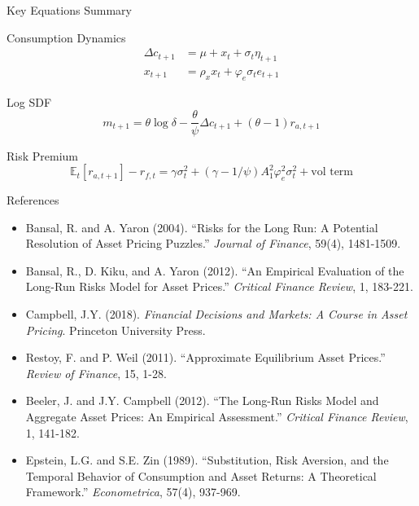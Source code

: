 \documentclass{beamer}
\newcommand{\E}{\mathbb{E}}
\begin{document}
\begin{frame}{Key Equations Summary}
    \begin{block}{Consumption Dynamics}
    \begin{align}
        \Delta c_{t+1} &= \mu + x_t + \sigma_t \eta_{t+1} \\
        x_{t+1} &= \rho_x x_t + \varphi_e \sigma_t e_{t+1}
    \end{align}
    \end{block}
    
    \begin{block}{Log SDF}
    \begin{equation}
        m_{t+1} = \theta \log \delta - \frac{\theta}{\psi} \Delta c_{t+1} + (\theta - 1) r_{a,t+1}
    \end{equation}
    \end{block}
    
    \begin{block}{Risk Premium}
    \begin{equation}
        \E_t[r_{a,t+1}] - r_{f,t} = \gamma \sigma_t^2 + (\gamma - 1/\psi) A_1^2 \varphi_e^2 \sigma_t^2 + \text{vol term}
    \end{equation}
    \end{block}
\end{frame}

\begin{frame}{References}
    \small
    \begin{itemize}
        \item Bansal, R. and A. Yaron (2004). ``Risks for the Long Run: A Potential Resolution of Asset Pricing Puzzles.'' \textit{Journal of Finance}, 59(4), 1481-1509.
        
        \item Bansal, R., D. Kiku, and A. Yaron (2012). ``An Empirical Evaluation of the Long-Run Risks Model for Asset Prices.'' \textit{Critical Finance Review}, 1, 183-221.
        
        \item Campbell, J.Y. (2018). \textit{Financial Decisions and Markets: A Course in Asset Pricing}. Princeton University Press.
        
        \item Restoy, F. and P. Weil (2011). ``Approximate Equilibrium Asset Prices.'' \textit{Review of Finance}, 15, 1-28.
        
        \item Beeler, J. and J.Y. Campbell (2012). ``The Long-Run Risks Model and Aggregate Asset Prices: An Empirical Assessment.'' \textit{Critical Finance Review}, 1, 141-182.
        
        \item Epstein, L.G. and S.E. Zin (1989). ``Substitution, Risk Aversion, and the Temporal Behavior of Consumption and Asset Returns: A Theoretical Framework.'' \textit{Econometrica}, 57(4), 937-969.
    \end{itemize}
\end{frame}
\end{document}
